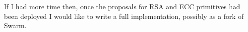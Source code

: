 \documentclass[12pt,a4paper,twoside,openright]{report}
\begin{document}
If I had more time then, once the proposals for RSA and ECC primitives had been deployed I would like to write
a full implementation, possibly as a fork of Swarm.
















\begingroup
\raggedright
\printbibliography
\endgroup
\end{document}
